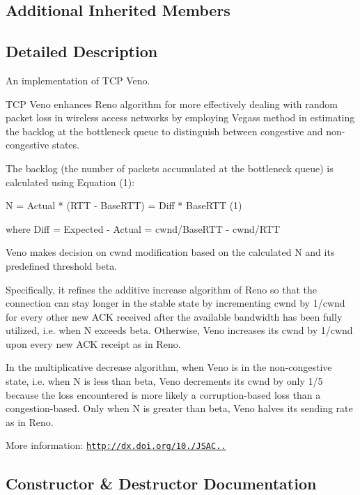 \subsection*{Additional Inherited Members}


\subsection{Detailed Description}
An implementation of T\+CP Veno. 

T\+CP Veno enhances Reno algorithm for more effectively dealing with random packet loss in wireless access networks by employing Vegas\textquotesingle{}s method in estimating the backlog at the bottleneck queue to distinguish between congestive and non-\/congestive states.

The backlog (the number of packets accumulated at the bottleneck queue) is calculated using Equation (1)\+: \begin{DoxyVerb}    N = Actual * (RTT - BaseRTT) = Diff * BaseRTT        (1)
\end{DoxyVerb}
 where Diff = Expected -\/ Actual = cwnd/\+Base\+R\+TT -\/ cwnd/\+R\+TT

Veno makes decision on cwnd modification based on the calculated N and its predefined threshold beta.

Specifically, it refines the additive increase algorithm of Reno so that the connection can stay longer in the stable state by incrementing cwnd by 1/cwnd for every other new A\+CK received after the available bandwidth has been fully utilized, i.\+e. when N exceeds beta. Otherwise, Veno increases its cwnd by 1/cwnd upon every new A\+CK receipt as in Reno.

In the multiplicative decrease algorithm, when Veno is in the non-\/congestive state, i.\+e. when N is less than beta, Veno decrements its cwnd by only 1/5 because the loss encountered is more likely a corruption-\/based loss than a congestion-\/based. Only when N is greater than beta, Veno halves its sending rate as in Reno.

More information\+: \href{http://dx.doi.org/10.1109/JSAC.2002.807336}{\tt http\+://dx.\+doi.\+org/10./\+J\+S\+A\+C..} 

\subsection{Constructor \& Destructor Documentation}
